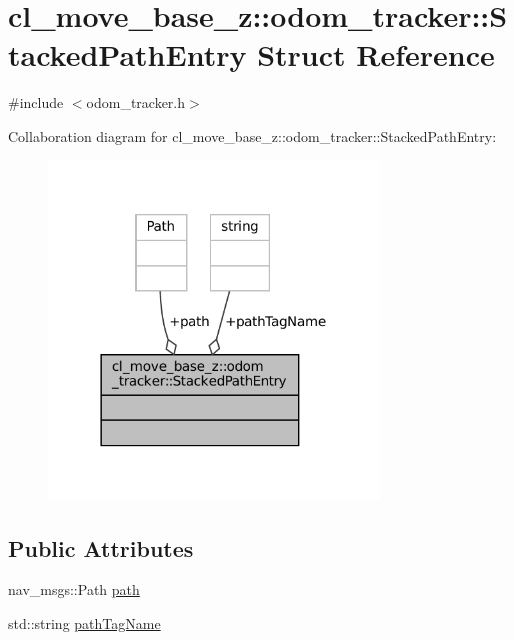 \hypertarget{structcl__move__base__z_1_1odom__tracker_1_1StackedPathEntry}{}\section{cl\+\_\+move\+\_\+base\+\_\+z\+:\+:odom\+\_\+tracker\+:\+:Stacked\+Path\+Entry Struct Reference}
\label{structcl__move__base__z_1_1odom__tracker_1_1StackedPathEntry}


{\ttfamily \#include $<$odom\+\_\+tracker.\+h$>$}



Collaboration diagram for cl\+\_\+move\+\_\+base\+\_\+z\+:\+:odom\+\_\+tracker\+:\+:Stacked\+Path\+Entry\+:
\nopagebreak
\begin{figure}[H]
\begin{center}
\leavevmode
\includegraphics[width=249pt]{structcl__move__base__z_1_1odom__tracker_1_1StackedPathEntry__coll__graph}
\end{center}
\end{figure}
\subsection*{Public Attributes}
\begin{DoxyCompactItemize}
\item 
nav\+\_\+msgs\+::\+Path \hyperlink{structcl__move__base__z_1_1odom__tracker_1_1StackedPathEntry_af117b7e2f89a07d3d1a4e0d74ed618ba}{path}
\item 
std\+::string \hyperlink{structcl__move__base__z_1_1odom__tracker_1_1StackedPathEntry_a9b1ae67f1bb17e4a5a4b8c5c500df377}{path\+Tag\+Name}
\end{DoxyCompactItemize}


